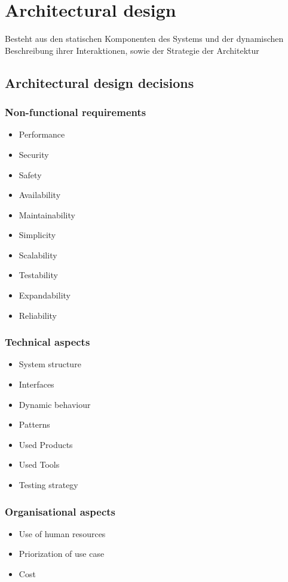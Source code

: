 \section{Architectural design}
Besteht aus den statischen Komponenten des Systems und der dynamischen Beschreibung ihrer Interaktionen, sowie der Strategie der Architektur
\subsection{Architectural design decisions}
\subsubsection{Non-functional requirements}
\begin{itemize}
	\item Performance
	\item Security
	\item Safety 
	\item Availability 
	\item Maintainability
	\item Simplicity
	\item Scalability
	\item Testability
	\item Expandability
	\item Reliability
\end{itemize}
\begin{multicols}{2}
\subsubsection{Technical aspects}
\begin{itemize}
	\item System structure
	\item Interfaces
	\item Dynamic behaviour 
	\item Patterns
	\item Used Products
	\item Used Tools
	\item Testing strategy
\end{itemize}
\columnbreak
\subsubsection{Organisational aspects}
\begin{itemize}
	\item Use of human resources
	\item Priorization of use case
	\item Cost
\end{itemize}	
\end{multicols}
